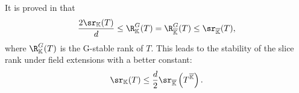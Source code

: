\begin{remark}\label{rem4-5}
It is proved in \cite{derksen2022g} that
\[
\frac{2 \sr_{\mathbb{K}}(T)}{d} \le \R^G_{\mathbb{K}}(T) = \R^G_{\overline{\mathbb{K}}}(T) \le \sr_{\overline{\mathbb{K}}}(T),
\]
where $\R^G_{\mathbb{K}}(T)$ is the G-stable rank of $T$.  This leads to the stability of the slice rank under field extensions with a better constant:
\begin{equation}\label{rem4-5:eq1}
\sr_{\mathbb{K}}(T)\le \frac{d}{2} \sr_{\overline{\mathbb{K}}}\left( T^{\overline{\mathbb{K}}} \right).
\end{equation}
\end{remark}
